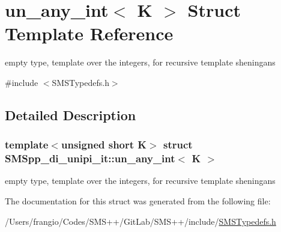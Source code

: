 \hypertarget{struct_s_m_spp__di__unipi__it_1_1un__any__int}{}\section{un\+\_\+any\+\_\+int$<$ K $>$ Struct Template Reference}
\label{struct_s_m_spp__di__unipi__it_1_1un__any__int}


empty type, template over the integers, for recursive template sheningans  




{\ttfamily \#include $<$S\+M\+S\+Typedefs.\+h$>$}



\subsection{Detailed Description}
\subsubsection*{template$<$unsigned short K$>$\newline
struct S\+M\+Spp\+\_\+di\+\_\+unipi\+\_\+it\+::un\+\_\+any\+\_\+int$<$ K $>$}

empty type, template over the integers, for recursive template sheningans 

The documentation for this struct was generated from the following file\+:\begin{DoxyCompactItemize}
\item 
/\+Users/frangio/\+Codes/\+S\+M\+S++/\+Git\+Lab/\+S\+M\+S++/include/\mbox{\hyperlink{_s_m_s_typedefs_8h}{S\+M\+S\+Typedefs.\+h}}\end{DoxyCompactItemize}
